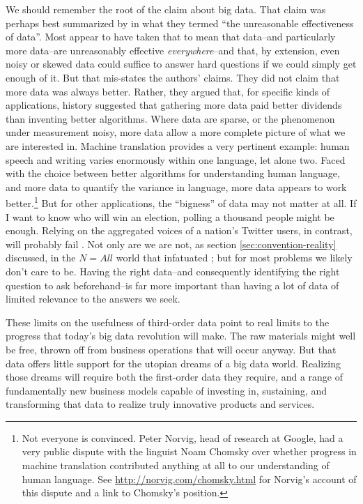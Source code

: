 \documentclass[12pt]{article}
\begin{document}
We should remember the root of the claim about big data. That claim
was perhaps best summarized by \cite{halevy2009unreasonable} in what
they termed ``the unreasonable effectiveness of data''. Most appear to
have
taken that to mean that data--and particularly more data--are
unreasonably effective \textit{everywhere}--and that, by extension,
even noisy or skewed data could suffice to answer hard questions if we
could simply get enough of it. But that mis-states the authors'
claims. They did not claim that more data was always better. Rather,
they argued that, for specific kinds
of applications, history suggested that gathering more data paid better
dividends than inventing better algorithms. Where data are sparse, or
the phenomenon under measurement noisy, more data allow a more
complete picture of what we are interested in. Machine translation
provides a very pertinent example: human speech and writing varies
enormously within one language, let alone two. Faced with the choice
between better algorithms for understanding human language, and more
data to quantify the variance in language, more data appears to work
better.\footnote{Not everyone is convinced. Peter Norvig, head of
  research at Google, had a very public dispute with the linguist Noam
Chomsky over whether progress in machine translation contributed
anything at all to our understanding of human language. See
\url{http://norvig.com/chomsky.html} for Norvig's account of this
dispute and a link to Chomsky's position.} But for other applications, the ``bigness'' of data may not matter at
all. If I want to know who will win an election, polling a thousand
people might be enough. Relying on the aggregated voices of a nation's
Twitter users, in contrast, will probably
fail \citep{gayo2011limits,gayo2012wanted,huberty2013}. Not only are
we are not, as section \ref{sec:convention-reality} discussed, 
in the $N=All$ world that infatuated
\cite{mayer2013big}; but for most problems we likely don't
care to be. Having the right data--and consequently identifying the right
question to ask beforehand--is far more important than having a lot of
data of limited relevance to the answers we seek.

These limits on the usefulness of third-order data point to real
limits to the progress that today's big data revolution will make. The
raw materials might well be free, thrown off from business operations
that will occur anyway. But that data offers little support for the
utopian dreams of a big data world. Realizing those dreams will
require both the first-order data they require, and a range of
fundamentally new business models capable of investing in, sustaining,
and transforming that data to realize truly innovative products and
services. 
\end{document}
